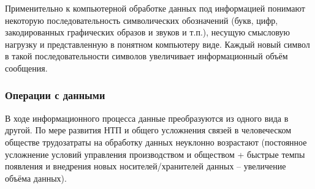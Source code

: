 \documentclass[a4paper]{article}
\begin{document}
 Применительно к компьютерной обработке данных под информацией понимают некоторую последовательность символических обозначений (букв, цифр, закодированных графических образов и звуков и т.п.), несущую смысловую нагрузку и представленную в понятном компьютеру виде. Каждый новый символ в такой последовательности символов увеличивает информационный объём сообщения.

\subsubsection{Операции с данными}

В ходе информационного процесса данные преобразуются из одного вида в другой. По мере развития НТП и общего усложнения связей в человеческом обществе трудозатраты на обработку данных неуклонно возрастают (постоянное усложнение условий управления производством и обществом + быстрые темпы появления и внедрения новых носителей/хранителей данных – увеличение объёма данных).
\end{document}
